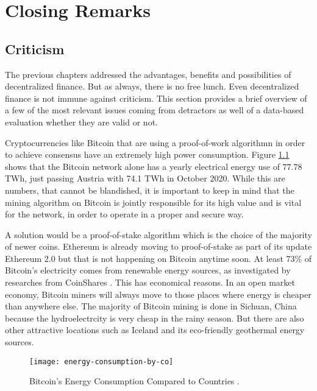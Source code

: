 \chapter{Closing Remarks}
\label{cha:ClosingRemarks}

\section{Criticism}
\label{sec:Criticism}

The previous chapters addressed the advantages, benefits and possibilities of decentralized finance. But as always, there is no free lunch.
Even decentralized finance is not immune against criticism. This section provides a brief overview of a few of the most relevant issues coming
from detractors as well of a data-based evaluation whether they are valid or not.

Cryptocurrencies like Bitcoin that are using a proof-of-work algorithmn in order to achieve consensus have an extremely high power consumption.
Figure \ref{fig:BtcEnergy} shows that the Bitcoin network alone has a yearly electrical energy use of 77.78 TWh, just passing Austria with
74.1 TWh in October 2020. While this are numbers, that cannot be blandished, it is important to keep in mind that the mining algorithm on
Bitcoin is jointly responsible for its high value and is vital for the network, in order to operate in a proper and secure way.

A solution would be a proof-of-stake algorithm which is the choice of the majority of newer coins. Ethereum is already moving to proof-of-stake
as part of its update Ethereum 2.0 but that is not happening on Bitcoin anytime soon. At least 73\% of Bitcoin's electricity comes from
renewable energy sources, as investigated by researches from CoinShares \cite[p.\ 8]{CoinShares2019}. This has economical reasons. In an open
market economy, Bitcoin miners will always move to those places where energy is cheaper than anywhere else. The majority of Bitcoin mining is
done in Sichuan, China because the hydroelectrcity is very cheap in the rainy season. But there are also other attractive locations such as
Iceland and its eco-friendly geothermal energy sources.

\begin{figure}
\centering
\texttt{[image: energy-consumption-by-co]}
\caption{Bitcoin's Energy Consumption Compared to Countries \cite{Digiconomist2020}.}
\label{fig:BtcEnergy}
\end{figure}

